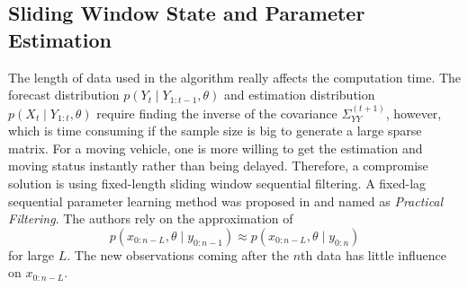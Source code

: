 %

\subsection{Sliding Window State and Parameter Estimation}

The length of data used in the algorithm really affects the computation time. The forecast distribution $p(Y_{t}\mid Y_{1:t-1},\theta)$ and estimation distribution $p(X_{t}\mid Y_{1:t},\theta)$ require finding the inverse of the covariance $\Sigma_{YY}^{(t+1)}$, however, which is time consuming if the sample size is big to generate a large sparse matrix. For a moving vehicle, one is more willing to get the estimation and moving status instantly rather than being delayed. Therefore, a compromise solution is using fixed-length sliding window sequential filtering. A fixed-lag sequential parameter learning method was proposed in \cite{polson2008practical} and named as \textit{Practical Filtering}. The authors rely on the approximation of 
\begin{equation*}
p(x_{0:n-L},\theta\mid y_{0:n-1}) \approx p(x_{0:n-L},\theta \mid y_{0:n})
\end{equation*}
for large $L$. The new observations coming after the $n$th data has little influence on $x_{0:n-L}$. 

